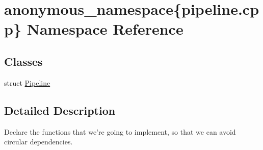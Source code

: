 \hypertarget{namespaceanonymous__namespace_02pipeline_8cpp_03}{\section{anonymous\-\_\-namespace\{pipeline.\-cpp\} Namespace Reference}
\label{namespaceanonymous__namespace_02pipeline_8cpp_03}
}
\subsection*{Classes}
\begin{DoxyCompactItemize}
\item 
struct \hyperlink{structanonymous__namespace_02pipeline_8cpp_03_1_1Pipeline}{Pipeline}
\end{DoxyCompactItemize}


\subsection{Detailed Description}
Declare the functions that we're going to implement, so that we can avoid circular dependencies. 